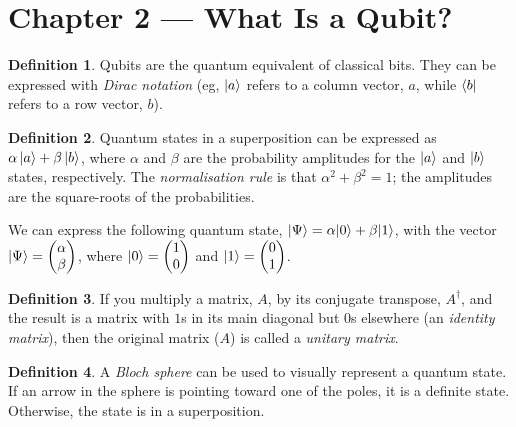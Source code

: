 \documentclass{article}
\theoremstyle{definition}
\newtheorem{definition}{Definition}[section]
\begin{document}
\section{Chapter 2 --- What Is a Qubit?}

\begin{definition}
    Qubits are the quantum equivalent of classical bits. They can be expressed with \emph{Dirac notation} (eg, $\ket{a}$ refers to a column vector, $a$, while $\bra{b}$ refers to a row vector, $b$).
\end{definition}
\begin{definition}
    Quantum states in a superposition can be expressed as $\alpha \ket{a} + \beta \ket{b}$, where $\alpha$ and $\beta$ are the probability amplitudes for the $\ket{a}$ and $\ket{b}$ states, respectively. The \emph{normalisation rule} is that $\alpha^2 + \beta^2 = 1$; the amplitudes are the square-roots of the probabilities.
\end{definition}

We can express the following quantum state, $\ket{\Psi} = \alpha{\ket{0}} + \beta{\ket{1}}$, with the vector $\ket{\Psi} = \begin{pmatrix}
\alpha\\
\beta
\end{pmatrix}$, where $\ket{0} = \begin{pmatrix}
    1\\
    0
\end{pmatrix}$ and $\ket{1} = \begin{pmatrix}
    0\\
    1
\end{pmatrix}$.

\begin{definition}
    If you multiply a matrix, $A$, by its conjugate transpose, $A^{\dagger}$, and the result is a matrix with $1$s in its main diagonal but $0$s elsewhere (an \emph{identity matrix}), then the original matrix ($A$) is called a \emph{unitary matrix}.
\end{definition}

\begin{definition}
    A \emph{Bloch sphere} can be used to visually represent a quantum state. If an arrow in the sphere is pointing toward one of the poles, it is a definite state. Otherwise, the state is in a superposition.
\end{definition}
\end{document}
